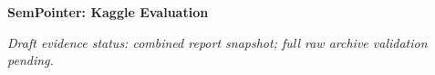 \documentclass[10pt]{article}
\begin{document}
\begin{center}\Large\bfseries SemPointer: Kaggle Evaluation\end{center}
\noindent\textit{Draft evidence status: combined report snapshot; full raw archive validation pending.}


\end{document}
